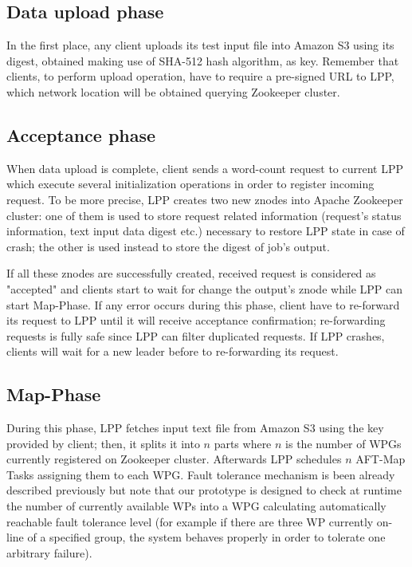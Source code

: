 \documentclass[sigchi]{acmart}
\begin{document}
\subsection{Data upload phase}

In the first place, any client uploads its test input file into Amazon S3 using its digest, obtained making use of SHA-512 hash algorithm, as key. Remember that clients, to perform upload operation, have to require a pre-signed URL to LPP, which network location will be obtained querying Zookeeper cluster.

\subsection{Acceptance phase}

When data upload is complete, client sends a word-count request to current LPP which execute several initialization operations in order to register incoming request. To be more precise, LPP creates two new znodes into Apache Zookeeper cluster: one of them is used to store request related information (request's status information, text input data digest etc.) necessary to restore LPP state in case of crash; the other is used instead to store the digest of job's output.  

If all these znodes are successfully created, received request is considered as "accepted" and clients start to wait for change the output's znode while LPP can start Map-Phase. If any error occurs during this phase, client have to re-forward its request to LPP until it will receive acceptance confirmation; re-forwarding requests is fully safe since LPP can filter duplicated requests. If LPP crashes, clients will wait for a new leader before to re-forwarding its request.

\subsection{Map-Phase}

During this phase, LPP fetches input text file from Amazon S3 using the key provided by client; then, it splits it into $n$ parts where $n$ is the number of WPGs currently registered on Zookeeper cluster. Afterwards LPP schedules $n$ AFT-Map Tasks assigning them to each WPG. Fault tolerance mechanism is been already described previously but note that our prototype is designed to check at runtime the number of currently available WPs into a WPG calculating automatically reachable fault tolerance level (for example if there are three WP currently on-line of a specified group, the system behaves properly in order to tolerate one arbitrary failure).
\end{document}
